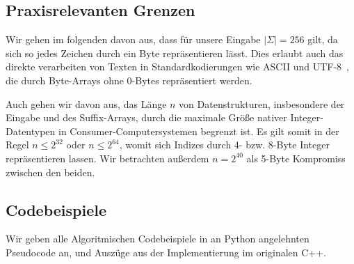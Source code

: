 \subsection{Praxisrelevanten Grenzen}

Wir gehen im folgenden davon aus, dass für unsere Eingabe $|\Sigma| = 256$ gilt, da sich so jedes Zeichen durch ein Byte repräsentieren lässt. Dies erlaubt auch das direkte verarbeiten von Texten in Standardkodierungen wie ASCII und UTF-8~\cite{grundlagen:utf8}, die durch Byte-Arrays ohne 0-Bytes repräsentiert werden.

Auch gehen wir davon aus, das Länge $n$ von Datenstrukturen, insbesondere der Eingabe und des Suffix-Arrays, durch die maximale Größe nativer Integer-Datentypen in Consumer-Computersystemen begrenzt ist. Es gilt somit in der Regel $n \leq 2^{32}$ oder $n \leq 2^{64}$, womit sich Indizes durch 4- bzw. 8-Byte Integer repräsentieren lassen. Wir betrachten außerdem $n = 2^{40}$ als 5-Byte Kompromiss zwischen den beiden.

\subsection{Codebeispiele}

Wir geben alle Algoritmischen Codebeispiele in an Python angelehnten Pseudocode an, und Auszüge aus der Implementierung im originalen C++. 

